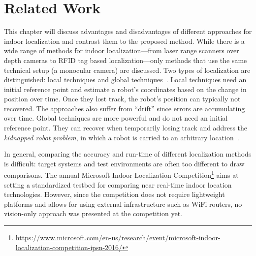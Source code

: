 \chapter{Related Work}
\label{chap:relatedwork}

This chapter will discuss advantages and disadvantages of different approaches for indoor localization and
contrast them to the proposed method. While there is a wide range of methods for indoor localization---from laser range scanners over depth cameras to RFID tag based localization---only methods that use the same technical setup (a monocular camera) are discussed. Two types of localization are distinguished: local techniques and global techniques~\cite{fox1999monte}. Local techniques need an initial reference point and estimate a robot's coordinates based on the change in position over time. Once they lost track, the robot's position can typically not recovered. The approaches also suffer from ``drift'' since errors are accumulating over time. Global techniques are more powerful and do not need an initial reference point. They can recover when temporarily losing track and address the \emph{kidnapped robot problem}, in which a robot is carried to an arbitrary location~\cite{engelson1992error}.  

In general, comparing the accuracy and run-time of different localization methods is difficult: target systems and test environments are often too different to draw comparisons. The annual Microsoft Indoor Localization Competition\footnote{\url{https://www.microsoft.com/en-us/research/event/microsoft-indoor-localization-competition-ipsn-2016/}} aims at setting a standardized testbed for comparing near real-time indoor location technologies. However, since the competition does not require lightweight platforms and allows for using external infrastructure such as WiFi routers, no vision-only approach was presented at the competition yet.